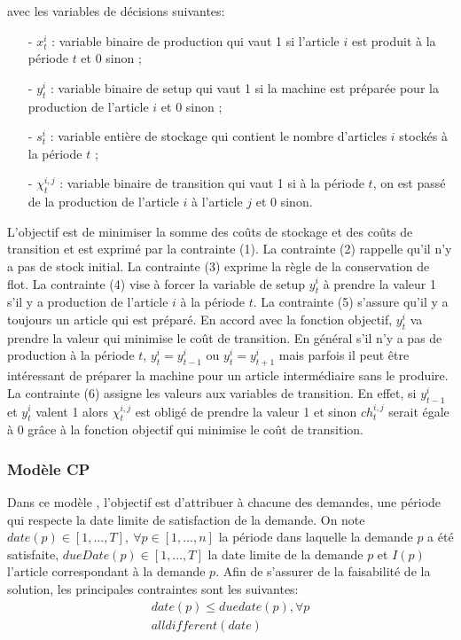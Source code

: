 		avec les variables de décisions suivantes: \\
		\begin{itemize}
			\item[-] $x_{t}^{i}$ : variable binaire de production qui vaut 1 si l’article $i$ est produit à la période $t$ et 0 sinon ;
			\item[-] $y_{t}^{i}$ : variable binaire de setup qui vaut 1 si la machine est préparée pour la production de l’article $i$ et 0 sinon ;
			\item[-] $s_{t}^{i}$ : variable entière de stockage qui contient le nombre d’articles $i$ stockés à la période $t$ ; 
			\item[-] $\chi_{t}^{i,j}$ : variable binaire de transition qui vaut 1 si à la période $t$, on est passé de la production de l’article $i$ à l’article $j$ et 0 sinon.
		\end{itemize}
		\vspace*{.3cm}
	\hspace*{.5cm} L'objectif est de minimiser la somme des coûts de stockage et des coûts de transition et est exprimé par la contrainte (1). La contrainte (2) rappelle qu'il n'y a pas de stock initial. La contrainte (3) exprime la règle de la conservation de flot. La contrainte (4) vise à forcer la variable de setup $y_{t}^{i}$ à prendre la valeur 1 s’il y a production de l’article $i$ à la période $t$. La contrainte (5) s'assure qu'il y a toujours un article qui est préparé. En accord avec la fonction objectif, $y_{t}^{i}$ va prendre la valeur qui minimise le coût de transition. En général s’il n’y a pas de production à la période $t$,
$y_{t}^{i} = y_{t-1}^{i}$ ou $y_{t}^{i} = y_{t+1}^{i}$
mais parfois il peut être intéressant de préparer la machine pour un article intermédiaire sans le produire. La contrainte (6) assigne les valeurs aux variables de transition.
En effet, si $y_{t-1}^{i}$ et $y_{t}^{i}$ valent 1 alors $\chi_{t}^{i,j}$ est obligé de prendre la valeur 1 et sinon $ch_{t}^{i,j}$ serait égale à 0 grâce à la fonction objectif qui minimise le coût de transition.
		
		\subsubsection{Modèle CP}
		Dans ce modèle \cite{ratheil_master}, l’objectif est d’attribuer à chacune des demandes, une période qui respecte la date limite de satisfaction de la demande. On note $date(p) \in [1,...,T],\ \forall p \in [1,...,n]$ la période dans laquelle la demande $p$ a été satisfaite, $dueDate(p) \in [1,...,T]$ la date limite de la demande $p$ et $I(p)$ l'article correspondant à la demande $p$. Afin de s'assurer de la faisabilité de la solution, les principales contraintes sont les suivantes:
		\begin{eqnarray}
			date(p) \leq duedate(p), \forall p \\
			alldifferent(date)
		\end{eqnarray}
		
